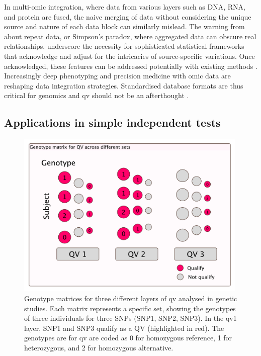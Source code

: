 In multi-omic integration, where data from various layers such as DNA, RNA, and protein are fused, the naive merging of data without considering the unique source and nature of each data block can similarly mislead. 
The warning from \citet{bland1994correlation} about repeat data, or Simpson's paradox, where aggregated data can obscure real relationships, underscore the necessity for sophisticated statistical frameworks that acknowledge and adjust for the intricacies of source-specific variations.
Once acknowledged, these features can be addressed potentially with existing methods
\cite{simpson1951interpretation, wright1934method, pearl2016causal}.
Increasingly deep phenotyping and precision medicine with omic data are reshaping data integration strategies. 
Standardised database formats are thus critical for genomics and \ac{qv} should not be an afterthought \cite{bycroft2018uk, all2024genomic, ogishima2021dbtmm}.

\subsection{Applications in simple independent tests} 

\begin{figure}[h]
    \centering
   \includegraphics[width=0.99\textwidth]{./images/qv_matrix.pdf}
    \caption{Genotype matrices for three different layers of \ac{qv} analysed in genetic studies. Each matrix represents a specific set, showing the genotypes of three individuals for three SNPs (SNP1, SNP2, SNP3).
    In the \ac{qv}1 layer, SNP1 and SNP3 qualify as a QV (highlighted in red). The genotypes are for \ac{qv} are coded as 0 for homozygous reference, 1 for heterozygous, and 2 for homozygous alternative.
    }
    \label{fig:qv_matrix}
\end{figure}

